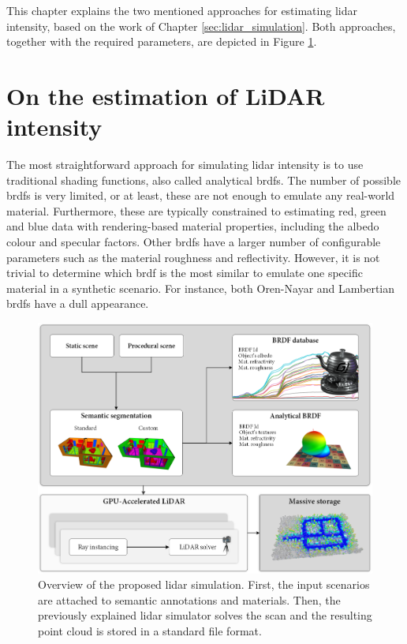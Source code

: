 This chapter explains the two mentioned approaches for estimating \acrshort{lidar} intensity, based on the work of Chapter \ref{sec:lidar_simulation}. Both approaches, together with the required parameters, are depicted in Figure \ref{fig:lidar_intensity_overview}.

\section{On the estimation of LiDAR intensity}

The most straightforward approach for simulating \acrshort{lidar} intensity is to use traditional shading functions, also called analytical \acrshort{brdf}s. The number of possible \acrshort{brdf}s is very limited, or at least, these are not enough to emulate any real-world material. Furthermore, these are typically constrained to estimating red, green and blue data with rendering-based material properties, including the albedo colour and specular factors. Other \acrshort{brdf}s have a larger number of configurable parameters such as the material roughness and reflectivity. However, it is not trivial to determine which \acrshort{brdf} is the most similar to emulate one specific material in a synthetic scenario. For instance, both Oren-Nayar and Lambertian \acrshort{brdf}s have a dull appearance.

\begin{figure}
    \centering
    \includegraphics[width=\linewidth]{figs/lidar_intensity/overview.png}
    \caption{Overview of the proposed \acrshort{lidar} simulation. First, the input scenarios are attached to semantic annotations and materials. Then, the previously explained \acrshort{lidar} simulator solves the scan and the resulting point cloud is stored in a standard file format.}
	\label{fig:lidar_intensity_overview}
\end{figure}

